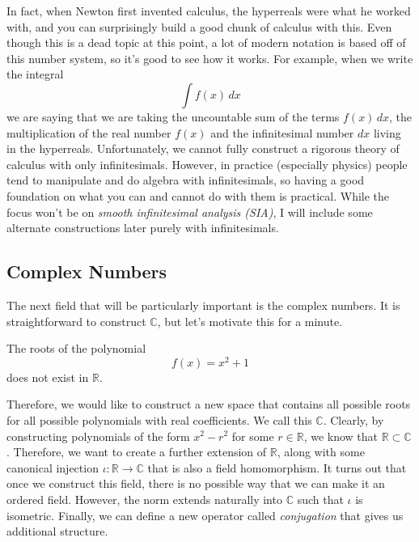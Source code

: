   In fact, when Newton first invented calculus, the hyperreals were what he worked with, and you can surprisingly build a good chunk of calculus with this. Even though this is a dead topic at this point, a lot of modern notation is based off of this number system, so it's good to see how it works. For example, when we write the integral 
  \begin{equation}
    \int f(x) \,dx
  \end{equation} 
  we are saying that we are taking the uncountable sum of the terms $f(x) \,dx$, the multiplication of the real number $f(x)$ and the infinitesimal number $dx$ living in the hyperreals. Unfortunately, we cannot fully construct a rigorous theory of calculus with only infinitesimals. However, in practice (especially physics) people tend to manipulate and do algebra with infinitesimals, so having a good foundation on what you can and cannot do with them is practical. While the focus won't be on \textit{smooth infinitesimal analysis (SIA)}, I will include some alternate constructions later purely with infinitesimals. 

\subsection{Complex Numbers} 

  The next field that will be particularly important is the complex numbers. It is straightforward to construct $\mathbb{C}$, but let's motivate this for a minute. 

  \begin{example}
    The roots of the polynomial 
    \begin{equation}
      f(x) = x^2 + 1
    \end{equation}
    does not exist in $\mathbb{R}$. 
  \end{example} 

  Therefore, we would like to construct a new space that contains all possible roots for all possible polynomials with real coefficients. We call this $\mathbb{C}$. Clearly, by constructing polynomials of the form $x^2 - r^2$ for some $r \in \mathbb{R}$, we know that $\mathbb{R} \subset \mathbb{C}$. Therefore, we want to create a further extension of $\mathbb{R}$, along with some canonical injection $\iota: \mathbb{R} \rightarrow \mathbb{C}$ that is also a field homomorphism. It turns out that once we construct this field, there is no possible way that we can make it an ordered field. However, the norm extends naturally into $\mathbb{C}$ such that $\iota$ is isometric. Finally, we can define a new operator called \textit{conjugation} that gives us additional structure. 

